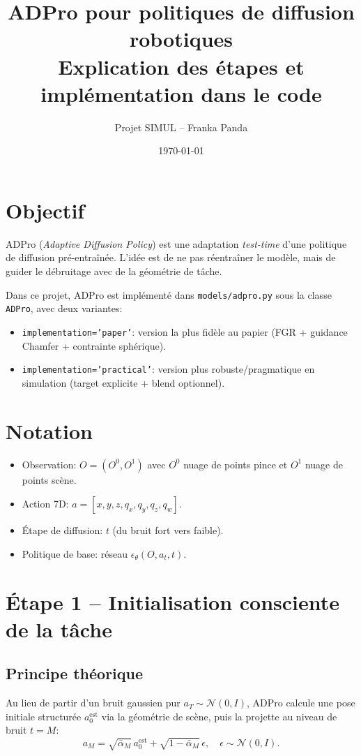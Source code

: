 \documentclass[11pt,a4paper]{article}
\title{ADPro pour politiques de diffusion robotiques\\\large Explication des étapes et implémentation dans le code}
\author{Projet SIMUL -- Franka Panda}
\date{\today}
\begin{document}
\maketitle

\section{Objectif}
ADPro (\emph{Adaptive Diffusion Policy}) est une adaptation \emph{test-time} d'une politique de diffusion pré-entraînée.
L'idée est de ne pas réentraîner le modèle, mais de guider le débruitage avec de la géométrie de tâche.

Dans ce projet, ADPro est implémenté dans \texttt{models/adpro.py} sous la classe \texttt{ADPro}, avec deux variantes:
\begin{itemize}
\item \texttt{implementation='paper'}: version la plus fidèle au papier (FGR + guidance Chamfer + contrainte sphérique).
\item \texttt{implementation='practical'}: version plus robuste/pragmatique en simulation (target explicite + blend optionnel).
\end{itemize}

\section{Notation}
\begin{itemize}
\item Observation: $O = (O^0, O^1)$ avec $O^0$ nuage de points pince et $O^1$ nuage de points scène.
\item Action 7D: $a=[x,y,z,q_x,q_y,q_z,q_w]$.
\item Étape de diffusion: $t$ (du bruit fort vers faible).
\item Politique de base: réseau $\epsilon_\theta(O,a_t,t)$.
\end{itemize}

\section{Étape 1 -- Initialisation consciente de la tâche}
\subsection{Principe théorique}
Au lieu de partir d'un bruit gaussien pur $a_T\sim\mathcal N(0,I)$, ADPro calcule une pose initiale structurée $a_0^{\text{est}}$ via la géométrie de scène,
puis la projette au niveau de bruit $t=M$:
\begin{equation}
 a_M = \sqrt{\bar\alpha_M}\,a_0^{\text{est}} + \sqrt{1-\bar\alpha_M}\,\epsilon,\quad \epsilon\sim\mathcal N(0,I).
\end{equation}
\end{document}
